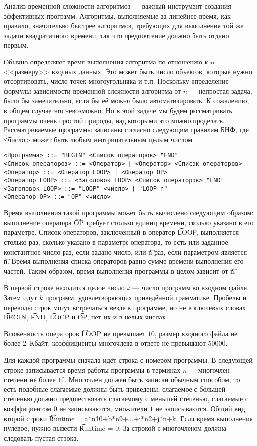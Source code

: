 Анализ временной сложности алгоритмов --- важный инструмент создания эффективных программ. Алгоритмы, выполняемые за линейное время, как правило, значительно быстрее алгоритмов, требующих для выполнения той же задачи квадратичного времени, так что предпочтение должно быть отдано первым. 

Обычно определяют время выполнения алгоритма по отношению к $n$ --- <<размеру>> входных данных. Это может быть число объектов, которые нужно отсортировать, число точек многоугольника и т.п. Поскольку определение формулы зависимости временной сложности алгоритма от $n$ --- непростая задача, было бы замечательно, если бы её можно было автоматизировать. К сожалению, в общем случае это невозможно. Но в этой задаче мы будем рассматривать программы очень простой природы, над которыми это можно проделать. Рассматриваемые программы записаны согласно следующим правилам БНФ, где \t{<число>} может быть любым неотрицательным целым числом:
\begin{verbatim}
<Программа> ::= "BEGIN" <Список операторов> "END"
<Список операторов> ::= <Оператор> | <Оператор> <Список операторов>
<Оператор> ::= <Оператор LOOP> | <Оператор OP>
<Оператор LOOP> ::= <Заголовок LOOP> <Список операторов> "END"
<Заголовок LOOP> ::= "LOOP" <число> | "LOOP n"
<Оператор OP> ::= "OP" <число>
\end{verbatim}

Время выполнения такой программы может быть вычислено следующим образом: выполнение оператора \t{OP} требует столько единиц времени, сколько указано в его параметре. Список операторов, заключённый в оператор \t{LOOP}, выполняется столько раз, сколько указано в параметре оператора, то есть или заданное константное число раз, если задано число, или \t{n} раз, если параметром является \t{n}. Время выполнения списка операторов равно сумме времени выполнения его частей. Таким образом, время выполнения программы в целом зависит от \t{n}. 


\InputFile

В первой строке находится целое число $k$ --- число программ во входном файле. Затем идут $k$ программ, удовлетворяющих приведённой грамматике. Пробелы и переводы строк могут встречаться везде в программе, но не в ключевых словах \t{BEGIN}, \t{END}, \t{LOOP} и \t{OP}, нет их и в целых числах. 

Вложенность операторов \t{LOOP} не превышает $10$, размер входного файла не более $2$~Кбайт, коэффициенты многочлена в ответе не превышают $50000$. 

\OutputFile

Для каждой программы сначала идёт строка с номером программы. В следующей строке записывается время работы программы в терминах $n$ --- многочлен степени не более $10$. Многочлен должен быть записан обычным способом, то есть подобные слагаемые должны быть приведены, слагаемое с большей степенью должно предшествовать слагаемому с меньшей степенью, слагаемые с коэффициентом $0$ не записываются, множители $1$ не записываются. Общий вид второй строки \t{Runtime = a*n\^10+b*n\^9+...+i*n\^2+j*n+k}. Если время выполнения нулевое, нужно вывести \t{Runtime = 0}. За строкой с многочленом должна следовать пустая строка. 


\SAMPLES
